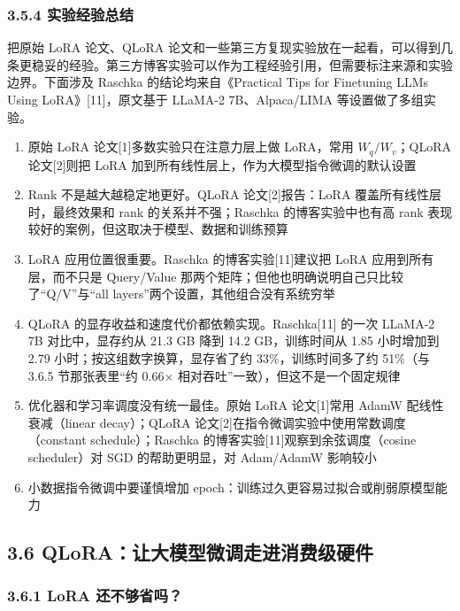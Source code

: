 \documentclass[
  chinese,
]{ctexart}
\providecommand{\tightlist}{%
  \setlength{\itemsep}{0pt}\setlength{\parskip}{0pt}}
\begin{document}
\subsubsection{3.5.4
实验经验总结}\label{ux5b9eux9a8cux7ecfux9a8cux603bux7ed3}

把原始 LoRA 论文、QLoRA
论文和一些第三方复现实验放在一起看，可以得到几条更稳妥的经验。第三方博客实验可以作为工程经验引用，但需要标注来源和实验边界。下面涉及
Raschka 的结论均来自《Practical Tips for Finetuning LLMs Using
LoRA》{[}11{]}，原文基于 LLaMA-2 7B、Alpaca/LIMA 等设置做了多组实验。

\begin{enumerate}
\def\labelenumi{\arabic{enumi}.}
\tightlist
\item
  原始 LoRA 论文{[}1{]}多数实验只在注意力层上做 LoRA，常用
  \(W_q/W_v\)；QLoRA 论文{[}2{]}则把 LoRA
  加到所有线性层上，作为大模型指令微调的默认设置
\item
  Rank 不是越大越稳定地更好。QLoRA 论文{[}2{]}报告：LoRA
  覆盖所有线性层时，最终效果和 rank 的关系并不强；Raschka
  的博客实验中也有高 rank 表现较好的案例，但这取决于模型、数据和训练预算
\item
  LoRA 应用位置很重要。Raschka 的博客实验{[}11{]}建议把 LoRA
  应用到所有层，而不只是 Query/Value
  那两个矩阵；但他也明确说明自己只比较了``Q/V''与``all
  layers''两个设置，其他组合没有系统穷举
\item
  QLoRA 的显存收益和速度代价都依赖实现。Raschka{[}11{]} 的一次 LLaMA-2
  7B 对比中，显存约从 21.3 GB 降到 14.2 GB，训练时间从 1.85 小时增加到
  2.79 小时；按这组数字换算，显存省了约 33\%，训练时间多了约 51\%（与
  3.6.5 节那张表里``约 0.66× 相对吞吐''一致），但这不是一个固定规律
\item
  优化器和学习率调度没有统一最佳。原始 LoRA 论文{[}1{]}常用 AdamW
  配线性衰减（linear decay）；QLoRA
  论文{[}2{]}在指令微调实验中使用常数调度（constant schedule）；Raschka
  的博客实验{[}11{]}观察到余弦调度（cosine scheduler）对 SGD
  的帮助更明显，对 Adam/AdamW 影响较小
\item
  小数据指令微调中要谨慎增加 epoch：训练过久更容易过拟合或削弱原模型能力
\end{enumerate}

\subsection{3.6
QLoRA：让大模型微调走进消费级硬件}\label{qloraux8ba9ux5927ux6a21ux578bux5faeux8c03ux8d70ux8fdbux6d88ux8d39ux7ea7ux786cux4ef6}

\subsubsection{3.6.1 LoRA
还不够省吗？}\label{lora-ux8fd8ux4e0dux591fux7701ux5417}
\end{document}
